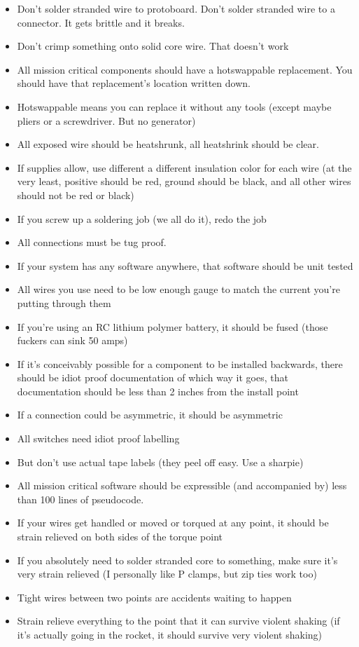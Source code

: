 \documentclass{article}
\begin{document}
\begin{itemize}

\item Don't solder stranded wire to protoboard. Don't solder stranded wire to a connector. It gets brittle and it breaks.
\item Don't crimp something onto solid core wire. That doesn't work
\item All mission critical components should have a hotswappable replacement. You should have that replacement's location written down.
\item Hotswappable means you can replace it without any tools (except maybe pliers or a screwdriver. But no generator)
\item All exposed wire should be heatshrunk, all heatshrink should be clear.
\item If supplies allow, use different a different insulation color for each wire (at the very least, positive should be red, ground should be black, and all other wires should not be red or black)
\item If you screw up a soldering job (we all do it), redo the job
\item All connections must be tug proof.
\item If your system has any software anywhere, that software should be unit tested
\item All wires you use need to be low enough gauge to match the current you're putting through them
\item If you're using an RC lithium polymer battery, it should be fused (those fuckers can sink 50 amps)
\item If it's conceivably possible for a component to be installed backwards, there should be idiot proof documentation of which way it goes, that documentation should be less than 2 inches from the install point
\item If a connection could be asymmetric, it should be asymmetric
\item All switches need idiot proof labelling
\item But don't use actual tape labels (they peel off easy. Use a sharpie)
\item All mission critical software should be expressible (and accompanied by) less than 100 lines of pseudocode.
\item If your wires get handled or moved or torqued at any point, it should be strain relieved on both sides of the torque point
\item If you absolutely need to solder stranded core to something, make sure it's very strain relieved (I personally like P clamps, but zip ties work too)
\item Tight wires between two points are accidents waiting to happen
\item Strain relieve everything to the point that it can survive violent shaking (if it's actually going in the rocket, it should survive very violent shaking)
\end{itemize}
\end{document}
